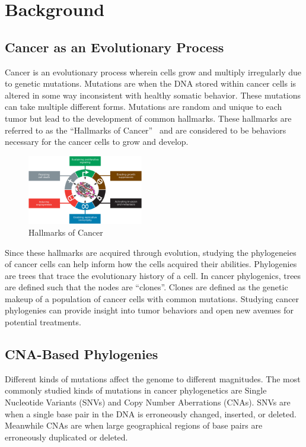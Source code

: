 \section{Background}

\subsection{Cancer as an Evolutionary Process}

Cancer is an evolutionary process wherein cells grow and multiply irregularly due to genetic mutations. Mutations are when the DNA stored within cancer cells is altered in some way inconsistent with healthy somatic behavior. These mutations can take multiple different forms. Mutations are random and unique to each tumor but lead to the development of common hallmarks. These hallmarks are referred to as the ``Hallmarks of Cancer''~\cite{hallmarks_of_cancer} and are considered to be behaviors necessary for the cancer cells to grow and develop. 

\begin{figure}[ht]\label{fig:hallmarks}
    \centering
    \includegraphics[width=0.45\textwidth]{figures/hallmarks.jpg}
    \caption{Hallmarks of Cancer~\cite{hallmarks_of_cancer}}
\end{figure}

Since these hallmarks are acquired through evolution, studying the phylogeneies of cancer cells can help inform how the cells acquired their abilities. Phylogenies are trees that trace the evolutionary history of a cell. In cancer phylogenics, trees are defined such that the nodes are ``clones''. Clones are defined as the genetic makeup of a population of cancer cells with common mutations. Studying cancer phylogenies can provide insight into tumor behaviors and open new avenues for potential treatments. 

\subsection{CNA-Based Phylogenies}

Different kinds of mutations affect the genome to different magnitudes. The most commonly studied kinds of mutations in cancer phylogenetics are Single Nucleotide Variants (SNVs) and Copy Number Aberrations (CNAs). SNVs are when a single base pair in the DNA is erroneously changed, inserted, or deleted. Meanwhile CNAs are when large geographical regions of base pairs are erroneously duplicated or deleted. 

